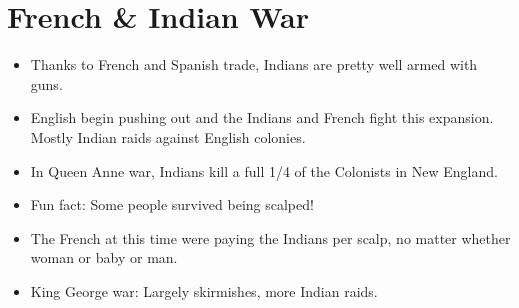\documentclass{article}
\begin{document}
\section{French \& Indian War}
  \begin{itemize}
    \item Thanks to French and Spanish trade, Indians are pretty well armed with guns. 
    \item English begin pushing out and the Indians and French fight this expansion. Mostly Indian raids against English colonies. 
    \item In Queen Anne war, Indians kill a full 1/4 of the Colonists in New England. 
    \item Fun fact: Some people survived being scalped! 
    \item The French at this time were paying the Indians per scalp, no matter whether woman or baby or man.
    \item King George war: Largely skirmishes, more Indian raids.
  \end{itemize}
\end{document}
